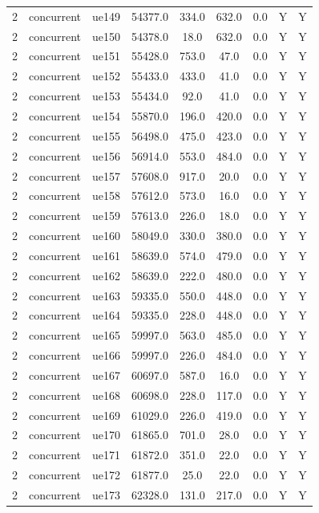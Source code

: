 \begin{table}[ht]
\begin{tabular}{|c|c|c|c|c|c|c|c|c|}
2 & concurrent & ue149 & 54377.0 & 334.0 & 632.0 & 0.0 & Y & Y \\
2 & concurrent & ue150 & 54378.0 & 18.0 & 632.0 & 0.0 & Y & Y \\
2 & concurrent & ue151 & 55428.0 & 753.0 & 47.0 & 0.0 & Y & Y \\
2 & concurrent & ue152 & 55433.0 & 433.0 & 41.0 & 0.0 & Y & Y \\
2 & concurrent & ue153 & 55434.0 & 92.0 & 41.0 & 0.0 & Y & Y \\
2 & concurrent & ue154 & 55870.0 & 196.0 & 420.0 & 0.0 & Y & Y \\
2 & concurrent & ue155 & 56498.0 & 475.0 & 423.0 & 0.0 & Y & Y \\
2 & concurrent & ue156 & 56914.0 & 553.0 & 484.0 & 0.0 & Y & Y \\
2 & concurrent & ue157 & 57608.0 & 917.0 & 20.0 & 0.0 & Y & Y \\
2 & concurrent & ue158 & 57612.0 & 573.0 & 16.0 & 0.0 & Y & Y \\
2 & concurrent & ue159 & 57613.0 & 226.0 & 18.0 & 0.0 & Y & Y \\
2 & concurrent & ue160 & 58049.0 & 330.0 & 380.0 & 0.0 & Y & Y \\
2 & concurrent & ue161 & 58639.0 & 574.0 & 479.0 & 0.0 & Y & Y \\
2 & concurrent & ue162 & 58639.0 & 222.0 & 480.0 & 0.0 & Y & Y \\
2 & concurrent & ue163 & 59335.0 & 550.0 & 448.0 & 0.0 & Y & Y \\
2 & concurrent & ue164 & 59335.0 & 228.0 & 448.0 & 0.0 & Y & Y \\
2 & concurrent & ue165 & 59997.0 & 563.0 & 485.0 & 0.0 & Y & Y \\
2 & concurrent & ue166 & 59997.0 & 226.0 & 484.0 & 0.0 & Y & Y \\
2 & concurrent & ue167 & 60697.0 & 587.0 & 16.0 & 0.0 & Y & Y \\
2 & concurrent & ue168 & 60698.0 & 228.0 & 117.0 & 0.0 & Y & Y \\
2 & concurrent & ue169 & 61029.0 & 226.0 & 419.0 & 0.0 & Y & Y \\
2 & concurrent & ue170 & 61865.0 & 701.0 & 28.0 & 0.0 & Y & Y \\
2 & concurrent & ue171 & 61872.0 & 351.0 & 22.0 & 0.0 & Y & Y \\
2 & concurrent & ue172 & 61877.0 & 25.0 & 22.0 & 0.0 & Y & Y \\
2 & concurrent & ue173 & 62328.0 & 131.0 & 217.0 & 0.0 & Y & Y \\

\end{tabular}
\end{table}
